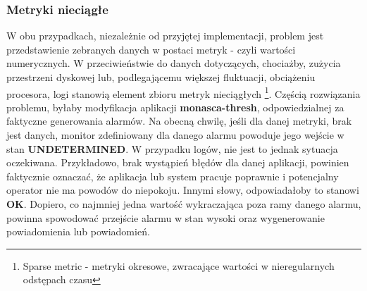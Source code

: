     \subsubsection{Metryki nieciągłe}
    W obu przypadkach, niezależnie od przyjętej implementacji, problem jest przedstawienie zebranych danych w postaci metryk - czyli wartości
    numerycznych. W przeciwieństwie do danych dotyczących, chociażby, zużycia przestrzeni dyskowej lub, podlegającemu większej
    fluktuacji, obciążeniu procesora, logi stanowią element zbioru metryk nieciągłych \footnote{Sparse metric - metryki okresowe,
    zwracające wartości w nieregularnych odstępach czasu}. Częścią rozwiązania problemu, byłaby modyfikacja aplikacji \textbf{monasca-thresh},
    odpowiedzialnej za faktyczne generowania alarmów. Na obecną chwilę, jeśli dla danej metryki, brak jest danych, monitor zdefiniowany
    dla danego alarmu powoduje jego wejście w stan \textbf{UNDETERMINED}. W przypadku logów, nie jest to jednak sytuacja oczekiwana. 
    Przykładowo, brak wystąpień błędów dla danej aplikacji, powinien faktycznie oznaczać, że aplikacja lub system pracuje poprawnie i
    potencjalny operator nie ma powodów do niepokoju. Innymi słowy, odpowiadałoby to stanowi \textbf{OK}. Dopiero, co najmniej jedna wartość
    wykraczająca poza ramy danego alarmu, powinna spowodować przejście alarmu w stan wysoki oraz wygenerowanie powiadomienia lub powiadomień.